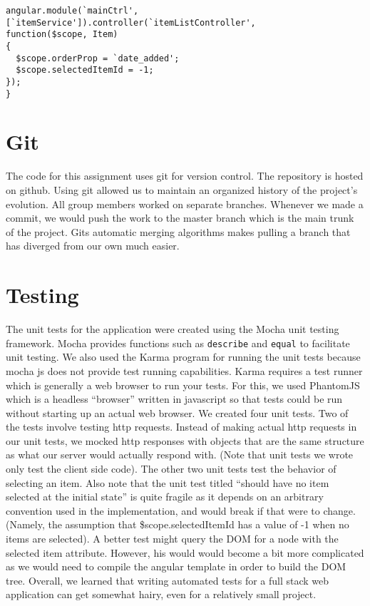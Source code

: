 \documentclass[letterpaper, 12pt]{article}
\begin{document}
\vspace{2mm}
\vspace{-3mm}\begin{verbatim}
angular.module(`mainCtrl',
[`itemService']).controller(`itemListController',
function($scope, Item) 
{
  $scope.orderProp = `date_added';
  $scope.selectedItemId = -1;
}); 
}
\end{verbatim}

\section{Git}
The code for this assignment uses git for version control. The repository is
hosted on github.  Using git allowed us to maintain an organized history of the project's evolution.  All group members worked on separate branches. Whenever we made a commit, we would push the work to the master branch which is the main trunk of the project. Gits automatic merging algorithms makes pulling a branch that has diverged from our own much easier.

\section{Testing}
The unit tests for the application were created using the Mocha unit testing framework.  Mocha provides functions such as \texttt{describe} and \texttt{equal} to facilitate unit testing. We also used the Karma program for running the unit tests because mocha js does not provide test running capabilities. Karma requires a test runner which is generally a web browser to run your tests.  For this, we used PhantomJS which is a headless ``browser'' written in javascript so that tests could be run without starting up an actual web browser.  We created four unit tests.  Two of the tests involve testing http requests.  Instead of making actual http requests in our unit tests, we mocked http responses with objects that are the same structure as what our server would actually respond with. (Note that unit tests we wrote only test the client side code).  The other two unit tests test the behavior of selecting an item. Also note that the unit test titled ``should have no item selected at the initial state'' is quite fragile as it depends on an arbitrary convention used in the implementation, and would break if that were to change. (Namely, the assumption that \$scope.selectedItemId has a value of -1 when no items are selected).  A better test might query the DOM for a node with the selected item attribute. However, his would would become a bit more complicated as we would need to compile the angular template in order to build the DOM tree. Overall, we learned that writing automated tests for a full stack web application can get somewhat hairy, even for a relatively small project.
\end{document}
